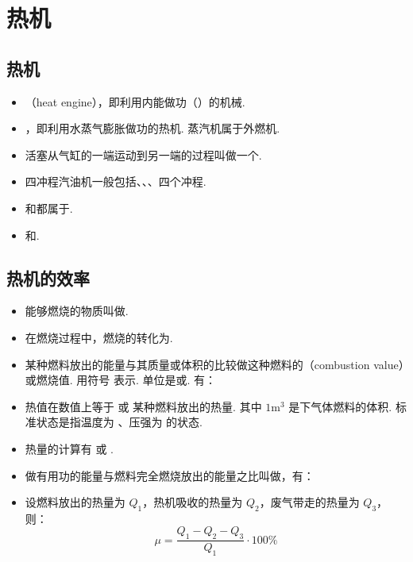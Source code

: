 \newpage
\section{热机}

\subsection{热机}
\vspace{10pt}
\begin{itemize}
\item {}（heat engine），即利用内能做功（）的机械.
\item {}，即利用水蒸气膨胀做功的热机. 蒸汽机属于外燃机.
\item 活塞从气缸的一端运动到另一端的过程叫做一个.
\item 四冲程汽油机一般包括、、、四个冲程.
\item {}和都属于.
\item {}和.
\end{itemize}

\subsection{热机的效率}
\vspace{10pt}
\begin{itemize}
\item 能够燃烧的物质叫做.
\item 在燃烧过程中，燃烧的转化为.
\item 某种燃料放出的能量与其质量或体积的比较做这种燃料的（combustion value）或燃烧值. 用符号  表示. 单位是或. 有：
\item 热值在数值上等于  或  某种燃料放出的热量. 其中 $1\text{m}^3$ 是下气体燃料的体积. 标准状态是指温度为 、压强为  的状态.
\item 热量的计算有  或 .
\item 做有用功的能量与燃料完全燃烧放出的能量之比叫做，有：
\item 设燃料放出的热量为 $Q_1$，热机吸收的热量为 $Q_2$，废气带走的热量为 $Q_3$，则：
$$
\mu=\frac{Q_1-Q_2-Q_3}{Q_1}\cdot100\%
$$
\end{itemize}